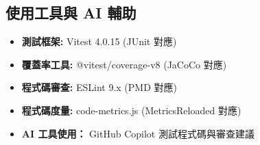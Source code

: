\documentclass[11pt, a4paper]{article}
\begin{document}
\subsection{使用工具與 AI 輔助}

\begin{itemize}[label=\textcolor{ElectricCyan}{$\blacksquare$}]
  \item \textbf{測試框架:} Vitest 4.0.15 (JUnit 對應)
  \item \textbf{覆蓋率工具:} @vitest/coverage-v8 (JaCoCo 對應)
  \item \textbf{程式碼審查:} ESLint 9.x (PMD 對應)
  \item \textbf{程式碼度量:} code-metrics.js (MetricsReloaded 對應)
  \item \textbf{AI 工具使用：} GitHub Copilot 測試程式碼與審查建議
\end{itemize}
\end{document}
